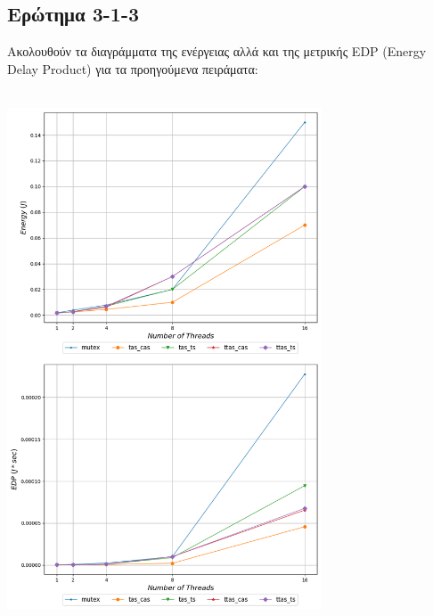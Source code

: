 \vspace{1em}
\subsection{Ερώτημα 3-1-3}
Ακολουθούν τα διαγράμματα της ενέργειας αλλά και της μετρικής EDP (Energy Delay Product)
για τα προηγούμενα πειράματα: 
\begin{minipage}{\textwidth}
   \begin{center}
      \\
      \vspace{3mm}
      \includegraphics[width=0.7\textwidth]{./graphs/sniper/energy/grain-1.png}
      \vspace{6mm}
   \end{center}
\end{minipage}

